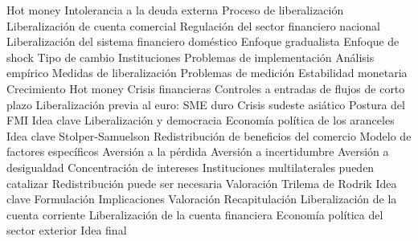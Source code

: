 \documentclass{nuevotema}
\begin{document}
\begin{esquema}[enumerate]
			\3 Hot money
			\3 Intolerancia a la deuda externa
		\2 Proceso de liberalización
			\3 Liberalización de cuenta comercial
			\3 Regulación del sector financiero nacional
			\3 Liberalización del sistema financiero doméstico
			\3 Enfoque gradualista
			\3 Enfoque de shock
			\3 Tipo de cambio
			\3 Instituciones
			\3 Problemas de implementación
		\2 Análisis empírico
			\3 Medidas de liberalización
			\3 Problemas de medición
			\3 Estabilidad monetaria
			\3 Crecimiento
			\3 Hot money
			\3 Crisis financieras
			\3 Controles a entradas de flujos de corto plazo
			\3 Liberalización previa al euro: SME duro
			\3 Crisis sudeste asiático
			\3 Postura del FMI
	\1 
		\2 Idea clave
		\2 Liberalización y democracia
		\2 Economía política de los aranceles
			\3 Idea clave
			\3 Stolper-Samuelson
			\3 Redistribución de beneficios del comercio
			\3 Modelo de factores específicos
			\3 Aversión a la pérdida
			\3 Aversión a incertidumbre
			\3 Aversión a desigualdad
			\3 Concentración de intereses
			\3 Instituciones multilaterales pueden catalizar
			\3 Redistribución puede ser necesaria
			\3 Valoración
		\2 Trilema de Rodrik
			\3 Idea clave
			\3 Formulación
			\3 Implicaciones
			\3 Valoración
	\1[] 
		\2 Recapitulación
			\3 Liberalización de la cuenta corriente
			\3 Liberalización de la cuenta financiera
			\3 Economía política del sector exterior
		\2 Idea final

\end{esquema}

\esquemalargo
\end{document}
